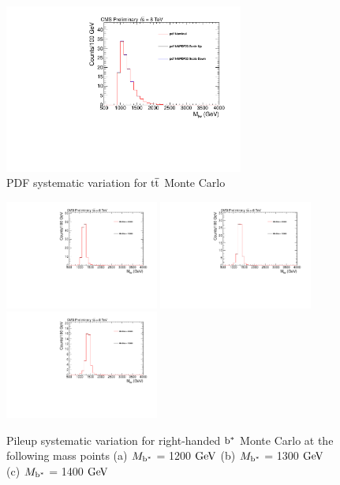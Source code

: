 \begin{figure}[htcb]
\begin{center}
\includegraphics[width=0.7\textwidth]{AN-14-049/figs/TTbar_PdfScaleNNPDF23.pdf}
\caption{PDF systematic variation for $\mathrm{t\overline{t}}$ Monte Carlo}
\label{figs:bsttbarPDF}
\end{center}
\end{figure}

\begin{figure}[htcb]
\begin{center}
\includegraphics[width=0.45\textwidth]{AN-14-049/figs/Signal_M1200_PileupReweighting.pdf}
\includegraphics[width=0.45\textwidth]{AN-14-049/figs/Signal_M1300_PileupReweighting.pdf}
\includegraphics[width=0.45\textwidth]{AN-14-049/figs/Signal_M1400_PileupReweighting.pdf}
\caption{
Pileup systematic variation for right-handed $\mathrm{b}^{*}$  Monte Carlo at the following mass points
(a) $M_{\mathrm{b}^{*}}$ = 1200$~\mathrm{GeV}$ 
(b) $M_{\mathrm{b}^{*}}$ = 1300$~\mathrm{GeV}$
(c) $M_{\mathrm{b}^{*}}$ = 1400$~\mathrm{GeV}$ 
}
\label{figs:bssignalPU}
\end{center}
\end{figure}

